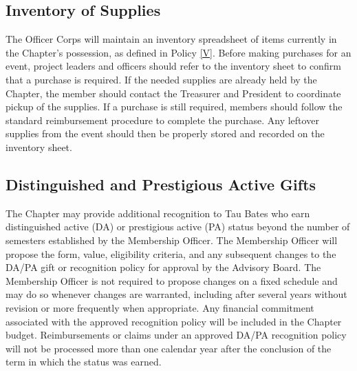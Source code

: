 \subsection{Inventory of Supplies} \label{VI.4}
The Officer Corps will maintain an inventory spreadsheet of items currently in the Chapter’s possession, as defined in Policy \ref{V}. 
Before making purchases for an event, project leaders and officers should refer to the inventory sheet to confirm that a purchase is required. 
If the needed supplies are already held by the Chapter, the member should contact the Treasurer and President to coordinate pickup of the supplies. 
If a purchase is still required, members should follow the standard reimbursement procedure to complete the purchase. 
Any leftover supplies from the event should then be properly stored and recorded on the inventory sheet.

\subsection{Distinguished and Prestigious Active Gifts} \label{VI.5}
The Chapter may provide additional recognition to Tau Bates who earn distinguished active (DA) or prestigious active (PA) status beyond the number of semesters established by the Membership Officer. 
The Membership Officer will propose the form, value, eligibility criteria, and any subsequent changes to the DA/PA gift or recognition policy for approval by the Advisory Board. 
The Membership Officer is not required to propose changes on a fixed schedule and may do so whenever changes are warranted, including after several years without revision 
or more frequently when appropriate. Any financial commitment associated with the approved recognition policy will be included in the Chapter budget. 
Reimbursements or claims under an approved DA/PA recognition policy will not be processed more than one calendar year after the conclusion of the term in which the status was earned.

